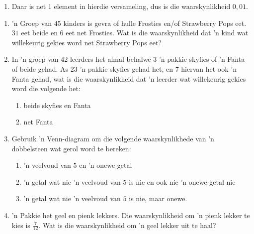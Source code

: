 \begin{solutions}{}
{\begin{enumerate}[itemsep=5pt, label=\textbf{\arabic*}. ]
\begin{enumerate}[noitemsep, label=\textbf{(\alph*)} ]
    $0,16$
    
    \item Daar is net $1$ element in hierdie versameling, dus is die waarskynlikheid $0,01$.
    \end{enumerate}

\end{enumerate}}
\end{solutions}


\begin{eocexercises}{}
  \begin{enumerate}[itemsep=5pt, label=\textbf{\arabic*}.]
  \item 'n Groep van $45$ kinders is gevra of hulle  Frosties en/of
    Strawberry Pops eet. $31$ eet beide en $6$ eet net Frosties.  Wat is die waarskynlikheid dat 'n kind wat willekeurig gekies word net Strawberry
    Pops eet?
  \item In 'n groep van $42$ leerders het almal behalwe $3$ 'n pakkie skyfies of 'n Fanta of beide gehad. As $23$ 'n pakkie skyfies gehad het, en $7$ hiervan het ook 'n Fanta gehad, wat is die waarskynlikheid dat 'n leerder wat willekeurig gekies word die volgende het:
    \begin{enumerate}[noitemsep, label=\textbf{(\alph*)} ]
    \item beide skyfies en Fanta
    \item net Fanta
    \end{enumerate}
  \item Gebruik 'n Venn-diagram om die volgende waarskynlikhede van 'n dobbelsteen wat gerol word te bereken:
    \begin{enumerate}[noitemsep, label=\textbf{(\alph*)} ]
    \item 'n veelvoud van $5$ en 'n onewe getal
    \item 'n getal wat nie 'n veelvoud van $5$ is nie en ook nie 'n onewe getal nie
    \item 'n getal wat nie 'n veelvoud van $5$ is nie, maar onewe.
    \end{enumerate}
  \item 'n Pakkie het geel en pienk lekkers. Die waarskynlikheid om 'n pienk lekker te kies is $\frac{7}{12}$.
Wat is die waarskynlikheid om 'n geel lekker uit te haal?


\end{enumerate}
\end{eocexercises}
